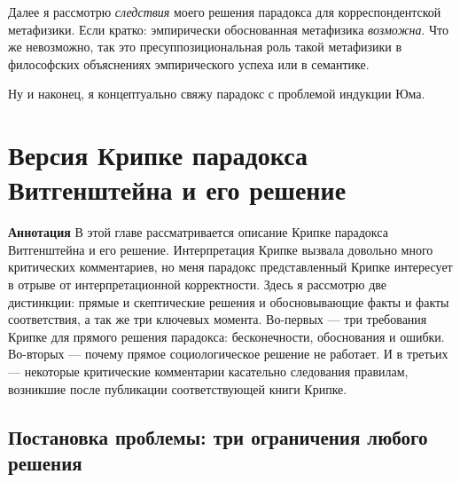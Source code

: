 \documentclass[12pt]{book}
\begin{document}
Далее я рассмотрю \textit{следствия} моего решения парадокса для корреспондентской метафизики. Если кратко: эмпирически обоснованная метафизика \textit{возможна}. Что же невозможно, так это пресуппозициональная роль такой метафизики в философских объяснениях эмпирического успеха или в семантике.

Ну и наконец, я концептуально свяжу парадокс с проблемой индукции Юма.

\chapter{Версия Крипке парадокса Витгенштейна и его решение}

\qquad

\textbf{Аннотация} \quad В этой главе рассматривается описание Крипке парадокса Витгенштейна и его решение. Интерпретация Крипке вызвала довольно много критических комментариев, но меня парадокс представленный Крипке интересует в отрыве от интерпретационной корректности. Здесь я рассмотрю две дистинкции: прямые и скептические решения и обосновывающие факты и факты соответствия, а так же три ключевых момента. Во-первых --- три требования Крипке для прямого решения парадокса: бесконечности, обоснования и ошибки. Во-вторых --- почему прямое социологическое решение не работает. И в третьих --- некоторые критические комментарии касательно следования правилам, возникшие после публикации соответствующей книги Крипке.

\qquad

\section{Постановка проблемы: три ограничения любого решения}
\end{document}
